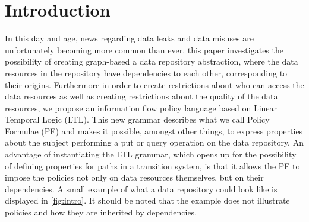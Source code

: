\section{Introduction}
In this day and age, news regarding data leaks and data misuses are unfortunately becoming more common than ever. 
this paper investigates the possibility of creating graph-based a data repository abstraction, where the data resources in the repository have dependencies to each other, corresponding to their origins. Furthermore in order to create restrictions about who can access the data resources as well as creating restrictions about the quality of the data resources, we propose an information flow policy language based on Linear Temporal Logic (LTL). This new grammar describes what we call Policy Formulae (PF) and makes it possible, amongst other things, to express properties about the subject performing a put or query operation on the data repository. An advantage of instantiating the LTL grammar, which opens up for the possibility of defining properties for paths in a transition system, is that it allows the PF to impose the policies not only on data resources themselves, but on their dependencies. A small example of what a data repository could look like is displayed in \autoref{fig:intro}. It should be noted that the example does not illustrate policies and how they are inherited by dependencies.

